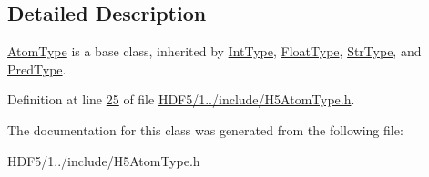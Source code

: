 \subsection{Detailed Description}
\hyperlink{class_h5_1_1_atom_type}{Atom\+Type} is a base class, inherited by \hyperlink{class_h5_1_1_int_type}{Int\+Type}, \hyperlink{class_h5_1_1_float_type}{Float\+Type}, \hyperlink{class_h5_1_1_str_type}{Str\+Type}, and \hyperlink{class_h5_1_1_pred_type}{Pred\+Type}. 

Definition at line \hyperlink{_h_d_f5_21_810_81_2include_2_h5_atom_type_8h_source_l00025}{25} of file \hyperlink{_h_d_f5_21_810_81_2include_2_h5_atom_type_8h_source}{H\+D\+F5/1../include/\+H5\+Atom\+Type.\+h}.



The documentation for this class was generated from the following file\+:\begin{DoxyCompactItemize}
\item 
H\+D\+F5/1../include/\+H5\+Atom\+Type.\+h\end{DoxyCompactItemize}
